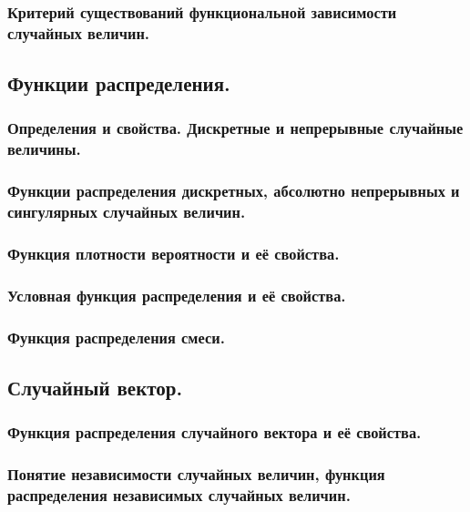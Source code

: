 \subsubsection{Критерий существований функциональной зависимости случайных величин.}
\subsection{Функции распределения.}
\subsubsection{Определения и свойства. Дискретные и непрерывные случайные величины.}
\subsubsection{Функции распределения дискретных, абсолютно непрерывных и сингулярных случайных величин.}
\subsubsection{Функция плотности вероятности и её свойства.}
\subsubsection{Условная функция распределения и её свойства.}
\subsubsection{Функция распределения смеси.}
\subsection{Случайный вектор.}
\subsubsection{Функция распределения случайного вектора и её свойства.}
\subsubsection{Понятие независимости случайных величин, функция распределения независимых случайных величин.}
